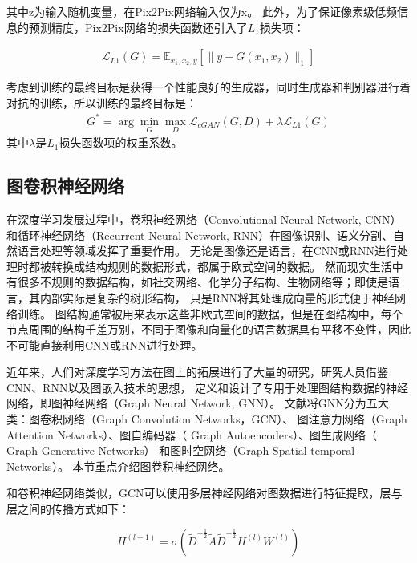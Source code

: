 \noindent 其中z为输入随机变量，在Pix2Pix网络输入仅为x。
此外，为了保证像素级低频信息的预测精度，Pix2Pix网络的损失函数还引入了$L_1$损失项：

\begin{equation}
\begin{aligned}
\mathcal{L}_{L 1}(G)=\mathbb{E}_{x_1, x_2, y}\left[\|y-G(x_1, x_2)\|_{1}\right]
\end{aligned}
\end{equation}

考虑到训练的最终目标是获得一个性能良好的生成器，同时生成器和判别器进行着对抗的训练，所以训练的最终目标是：
\begin{equation}
\begin{aligned}
G^{*}=\arg \min _{G} \max _{D} \mathcal{L}_{c G A N}(G, D)+\lambda \mathcal{L}_{L 1}(G)
\end{aligned}
\end{equation}
\noindent 其中$\lambda$是$L_1$损失函数项的权重系数。


\subsection{图卷积神经网络}

在深度学习发展过程中，卷积神经网络（Convolutional Neural Network, CNN）和循环神经网络（Recurrent Neural Network, RNN）在图像识别、语义分割、自然语言处理等领域发挥了重要作用。
无论是图像还是语言，在CNN或RNN进行处理时都被转换成结构规则的数据形式，都属于欧式空间的数据。
然而现实生活中有很多不规则的数据结构，如社交网络、化学分子结构、生物网络等；即使是语言，其内部实际是复杂的树形结构，
只是RNN将其处理成向量的形式便于神经网络训练。
图结构通常被用来表示这些非欧式空间的数据，但是在图结构中，每个节点周围的结构千差万别，不同于图像和向量化的语言数据具有平移不变性，因此不可能直接利用CNN或RNN进行处理。

近年来，人们对深度学习方法在图上的拓展进行了大量的研究，研究人员借鉴CNN、RNN以及图嵌入技术的思想，
定义和设计了专用于处理图结构数据的神经网络，即图神经网络（Graph  Neural  Network, GNN）。
文献\cite{2019A}将GNN分为五大类：图卷积网络（Graph Convolution Networks，GCN）、 图注意力网络（Graph Attention Networks）、图自编码器（ Graph Autoencoders）、图生成网络（ Graph Generative Networks） 和图时空网络（Graph Spatial-temporal Networks）。
本节重点介绍图卷积神经网络\cite{2016Semi}。

和卷积神经网络类似，GCN可以使用多层神经网络对图数据进行特征提取，层与层之间的传播方式如下：

\begin{equation}
H^{(l+1)}=\sigma\left(\tilde{D}^{-\frac{1}{2}} \tilde{A} \tilde{D}^{-\frac{1}{2}} H^{(l)} W^{(l)}\right)
\end{equation}

